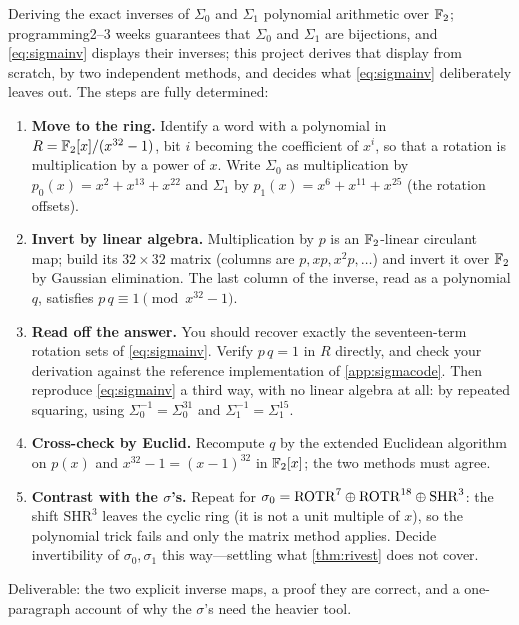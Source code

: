 \begin{project}{Deriving the exact inverses of $\Sigma_0$ and $\Sigma_1$}
  {polynomial arithmetic over $\mathbb{F}_2$; programming}{2--3 weeks}
   guarantees that $\Sigma_0$ and $\Sigma_1$ are
  bijections, and \cref{eq:sigmainv} displays their inverses; this
  project derives that display from scratch, by two independent methods,
  and decides what \cref{eq:sigmainv} deliberately leaves out. The steps
  are fully determined:
  \begin{enumerate}
    \item \textbf{Move to the ring.} Identify a word with a polynomial in
      $R = \mathbb{F}_2[x]/(x^{32}-1)$, bit $i$ becoming the coefficient of
      $x^i$, so that a rotation is multiplication by a power of $x$.
      Write $\Sigma_0$ as multiplication by
      $p_0(x) = x^{2} + x^{13} + x^{22}$ and $\Sigma_1$ by
      $p_1(x) = x^{6} + x^{11} + x^{25}$ (the \SHA{} rotation offsets).
    \item \textbf{Invert by linear algebra.} Multiplication by $p$ is an
      $\mathbb{F}_2$-linear circulant map; build its $32\times32$ matrix (columns
      are $p, xp, x^2p, \dots$) and invert it over $\mathbb{F}_2$ by Gaussian
      elimination. The last column of the inverse, read as a polynomial
      $q$, satisfies $p\,q \equiv 1 \pmod{x^{32}-1}$.
    \item \textbf{Read off the answer.} You should recover exactly the
      seventeen-term rotation sets of \cref{eq:sigmainv}. Verify
      $p\,q = 1$ in $R$ directly, and check your derivation against the
      reference implementation of \cref{app:sigmacode}. Then reproduce
      \cref{eq:sigmainv} a third way, with no linear algebra at all: by
      repeated squaring, using $\Sigma_0^{-1} = \Sigma_0^{31}$ and
      $\Sigma_1^{-1} = \Sigma_1^{15}$.
    \item \textbf{Cross-check by Euclid.} Recompute $q$ by the extended
      Euclidean algorithm on $p(x)$ and $x^{32}-1 = (x-1)^{32}$ in
      $\mathbb{F}_2[x]$; the two methods must agree.
    \item \textbf{Contrast with the $\sigma$'s.} Repeat for
      $\sigma_0 = \mathrm{ROTR}^{7}\oplus\mathrm{ROTR}^{18}\oplus
      \mathrm{SHR}^{3}$: the shift $\mathrm{SHR}^{3}$ leaves the cyclic
      ring (it is not a unit multiple of $x$), so the polynomial trick
      fails and only the matrix method applies. Decide invertibility of
      $\sigma_0, \sigma_1$ this way---settling what \cref{thm:rivest}
      does not cover.
  \end{enumerate}
  Deliverable: the two explicit inverse maps, a proof they are correct,
  and a one-paragraph account of why the $\sigma$'s need the heavier tool.
\end{project}

